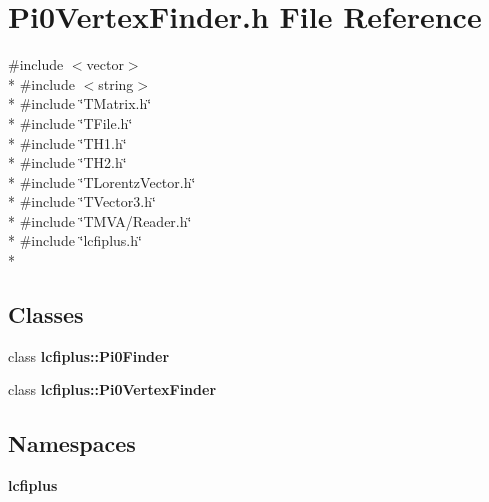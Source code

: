 \section{Pi0\-Vertex\-Finder.\-h File Reference}
\label{Pi0VertexFinder_8h}
{\ttfamily \#include $<$vector$>$}\\*
{\ttfamily \#include $<$string$>$}\\*
{\ttfamily \#include \char`\"{}T\-Matrix.\-h\char`\"{}}\\*
{\ttfamily \#include \char`\"{}T\-File.\-h\char`\"{}}\\*
{\ttfamily \#include \char`\"{}T\-H1.\-h\char`\"{}}\\*
{\ttfamily \#include \char`\"{}T\-H2.\-h\char`\"{}}\\*
{\ttfamily \#include \char`\"{}T\-Lorentz\-Vector.\-h\char`\"{}}\\*
{\ttfamily \#include \char`\"{}T\-Vector3.\-h\char`\"{}}\\*
{\ttfamily \#include \char`\"{}T\-M\-V\-A/\-Reader.\-h\char`\"{}}\\*
{\ttfamily \#include \char`\"{}lcfiplus.\-h\char`\"{}}\\*
\subsection*{Classes}
\begin{DoxyCompactItemize}
\item 
class {\bf lcfiplus\-::\-Pi0\-Finder}
\item 
class {\bf lcfiplus\-::\-Pi0\-Vertex\-Finder}
\end{DoxyCompactItemize}
\subsection*{Namespaces}
\begin{DoxyCompactItemize}
\item 
{\bf lcfiplus}
\end{DoxyCompactItemize}
